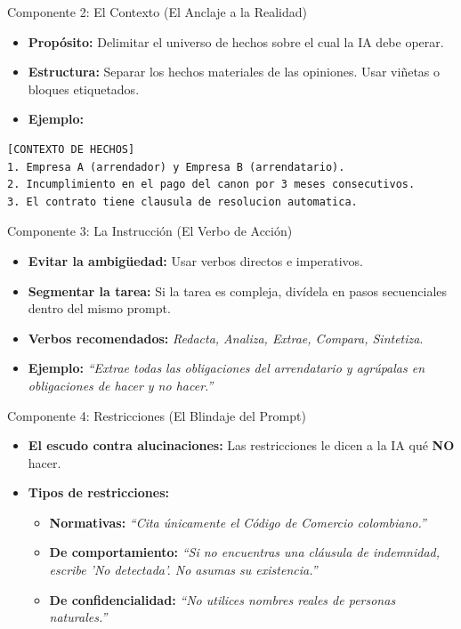 \documentclass[aspectratio=169]{beamer}
\begin{document}
\begin{frame}[fragile]{Componente 2: El Contexto (El Anclaje a la Realidad)}


\begin{itemize}
  \item \textbf{Propósito:} Delimitar el universo de hechos sobre el cual la IA debe operar.
  \item \textbf{Estructura:} Separar los hechos materiales de las opiniones. Usar viñetas o bloques etiquetados.
  \item \textbf{Ejemplo:}
\end{itemize}
\begin{lstlisting}[basicstyle=\ttfamily\scriptsize]
[CONTEXTO DE HECHOS]
1. Empresa A (arrendador) y Empresa B (arrendatario).
2. Incumplimiento en el pago del canon por 3 meses consecutivos.
3. El contrato tiene clausula de resolucion automatica.
\end{lstlisting}


\end{frame}



\begin{frame}[fragile]{Componente 3: La Instrucción (El Verbo de Acción)}


\begin{itemize}
  \item \textbf{Evitar la ambigüedad:} Usar verbos directos e imperativos.
  \item \textbf{Segmentar la tarea:} Si la tarea es compleja, divídela en pasos secuenciales dentro del mismo prompt.
  \item \textbf{Verbos recomendados:} \textit{Redacta, Analiza, Extrae, Compara, Sintetiza}.
  \item \textbf{Ejemplo:} \textit{``Extrae todas las obligaciones del arrendatario y agrúpalas en obligaciones de hacer y no hacer.''}
\end{itemize}
\end{frame}



\begin{frame}[fragile]{Componente 4: Restricciones (El Blindaje del Prompt)}


\begin{itemize}
  \item \textbf{El escudo contra alucinaciones:} Las restricciones le dicen a la IA qué \textbf{NO} hacer.
  \item \textbf{Tipos de restricciones:}
  \begin{itemize}
    \item \textbf{Normativas:} \textit{``Cita únicamente el Código de Comercio colombiano.''}
    \item \textbf{De comportamiento:} \textit{``Si no encuentras una cláusula de indemnidad, escribe 'No detectada'. No asumas su existencia.''}
    \item \textbf{De confidencialidad:} \textit{``No utilices nombres reales de personas naturales.''}
  \end{itemize}
\end{itemize}
\end{frame}
\end{document}
